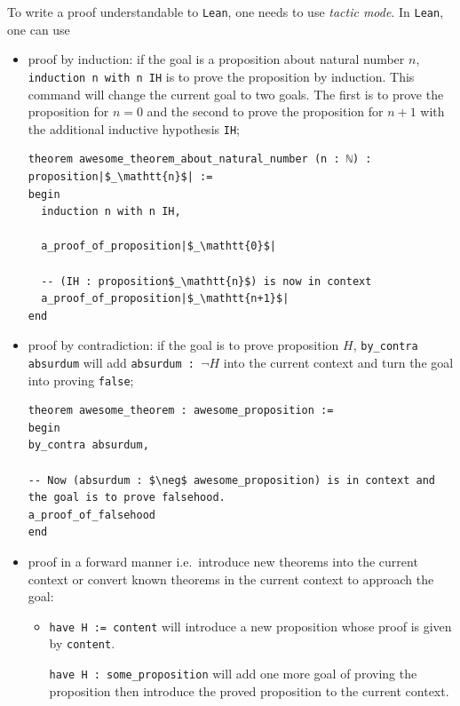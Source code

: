 \documentclass{report}
\theoremstyle{definition}
\begin{document}
To write a proof understandable to {\tt \small Lean}, one needs to use {\it tactic mode}. In {\tt \small Lean}, one can use
\begin{itemize}
  \item proof by induction: if the goal is a proposition about natural number $n$, {\tt \small induction n with n IH} is to prove the proposition by induction. This command will change the current goal to two goals. The first is to prove the proposition for $n=0$ and the second to prove the proposition for $n+1$ with the additional inductive hypothesis {\tt \small IH};

\begin{verbatim}
theorem awesome_theorem_about_natural_number (n : ℕ) : proposition|$_\mathtt{n}$| :=
begin
  induction n with n IH,

  a_proof_of_proposition|$_\mathtt{0}$|

  -- (IH : proposition$_\mathtt{n}$) is now in context
  a_proof_of_proposition|$_\mathtt{n+1}$|
end
\end{verbatim}

  \item proof by contradiction: if the goal is to prove proposition $H$, {\tt \small by\_contra absurdum} will add {\tt \small absurdum : $\neg H$} into the current context and turn the goal into proving {\tt \small false};

\begin{verbatim}
theorem awesome_theorem : awesome_proposition :=
begin
by_contra absurdum,

-- Now (absurdum : $\neg$ awesome_proposition) is in context and the goal is to prove falsehood.
a_proof_of_falsehood
end
\end{verbatim}
  \item proof in a forward manner i.e.\ introduce new theorems into the current context or convert known theorems in the current context to approach the goal:
  \begin{itemize}
    \item {\tt \small have H := content} will introduce a new proposition whose proof is given by {\tt \small content}.
    
    {\tt \small have H : some\_proposition} will add one more goal of proving the proposition then introduce the proved proposition to the current context.


\end{itemize}
\end{itemize}
\end{document}
